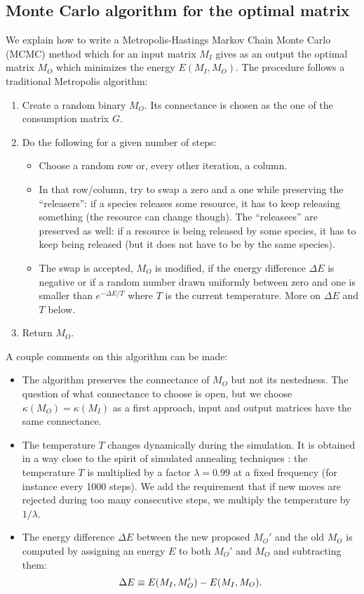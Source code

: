 \documentclass[12pt, titlepage]{report}
\begin{document}
\subsection{Monte Carlo algorithm for the optimal matrix} \label{section: methods LRI MC solver}
We explain how to write a Metropolis-Hastings Markov Chain Monte Carlo (MCMC) method which for an input matrix $M_I$ gives as an output the optimal matrix $M_O$ which minimizes the energy $E(M_I, M_O)$. The procedure follows a traditional Metropolis algorithm:
\begin{enumerate}
\item Create a random binary $M_O$. Its connectance is chosen as the one of the consumption matrix $G$.
\item Do the following for a given number of steps:
\begin{itemize}
\item Choose a random row or, every other iteration, a column.
\item In that row/column, try to swap a zero and a one while preserving the ``releasers'': if a species releases some resource, it has to keep releasing something (the resource can change though). The ``releasees'' are preserved as well: if a resource is being released by some species, it has to keep being released (but it does not have to be by the same species).
\item The swap is accepted, \ie $M_O$ is modified, if the energy difference $\Delta E$ is negative or if a random number drawn uniformly between zero and one is smaller than $e^{-\Delta E/T}$ where $T$ is the current temperature. More on $\Delta E$ and $T$ below.
\end{itemize}
\item Return $M_O$.
\end{enumerate}
A couple comments on this algorithm can be made:
\begin{itemize}
\item The algorithm preserves the connectance of $M_O$ but not its nestedness. The question of what connectance to choose is open, but we choose $\kappa(M_O)=\kappa(M_I)$ as a first approach, \ie input and output matrices have the same connectance.
\item The temperature $T$ changes dynamically during the simulation. It is obtained in a way close to the spirit of simulated annealing techniques \cite{gendreau_simulated_2019}: the temperature $T$ is multiplied by a factor $\lambda=0.99$ at a fixed frequency (for instance every 1000 steps). We add the requirement that if new moves are rejected during too many consecutive steps, we multiply the temperature by $1/\lambda$.
\item The energy difference $\Delta E$ between the new proposed $M_O'$ and the old $M_O$ is computed by assigning an energy $E$ to both $M_O'$ and $M_O$ and subtracting them:
\begin{equation}
\Delta E \equiv E(M_I, M_O')-E(M_I, M_O).
\end{equation}
\end{itemize}
\end{document}

